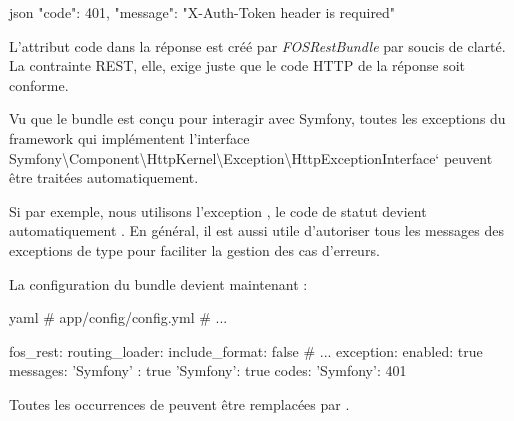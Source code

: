 \documentclass[big]{zmdocument}
\begin{document}
\begin{CodeBlock}{json}
{
  "code": 401,
  "message": "X-Auth-Token header is required"
}
\end{CodeBlock}



\begin{Information}
L'attribut code dans la réponse est créé par \textit{FOSRestBundle} par soucis de clarté. La contrainte REST, elle, exige juste que le code HTTP de la réponse soit conforme.
\end{Information}


Vu que le bundle est conçu pour interagir avec Symfony, toutes les exceptions du framework qui implémentent l'interface \CodeInline{}Symfony\textbackslash{}Component\textbackslash{}HttpKernel\textbackslash{}Exception\textbackslash{}HttpExceptionInterface` peuvent être traitées automatiquement.



Si par exemple, nous utilisons l'exception , le code de statut devient automatiquement . En général, il est aussi utile d'autoriser tous les messages des exceptions de type  pour faciliter la gestion des cas d'erreurs.



La configuration du bundle devient maintenant :



\begin{CodeBlock}{yaml}
# app/config/config.yml
# ...

fos_rest:
    routing_loader:
        include_format: false
    # ...
    exception:
        enabled: true
        messages:
            'Symfony\Component\HttpKernel\Exception\HttpException' : true
            'Symfony\Component\Security\Core\Exception\BadCredentialsException': true
        codes:
            'Symfony\Component\Security\Core\Exception\BadCredentialsException': 401
\end{CodeBlock}



Toutes les occurrences de  peuvent être remplacées par .
\end{document}
